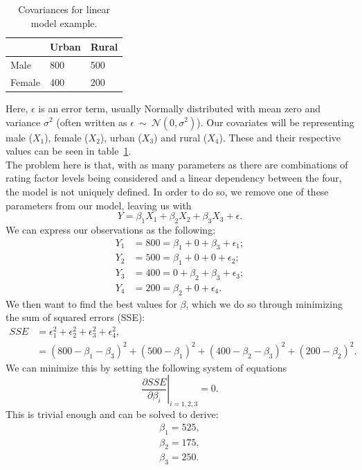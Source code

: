 \documentclass{article}
\begin{document}
\begin{table}[H]
\centering
\begin{tabular}{l|l|l|}
\cline{2-3}
                             & Urban & Rural \\ \hline
\multicolumn{1}{|l|}{Male}   & 800   & 500   \\ \hline
\multicolumn{1}{|l|}{Female} & 400   & 200   \\ \hline
\end{tabular}
    \caption{Covariances for linear model example.}
    \label{fig:covariances_example}
\end{table}

Here, $\epsilon$ is an error term, usually Normally distributed with mean zero and variance $\sigma^2$ (often written as $\epsilon~\sim~\mathcal{N}(0,\sigma^2)$). Our covariates will be representing male ($X_1$), female ($X_2$), urban ($X_3$) and rural ($X_4$). These and their respective values can be seen in table~\ref{fig:covariances_example}.\\
The problem here is that, with as many parameters as there are combinations of rating factor levels being considered and a linear dependency between the four, the model is not uniquely defined. In order to do so, we remove one of these parameters from our model, leaving us with
\begin{equation}
    Y = \beta_1X_1 + \beta_2X_2 + \beta_3X_3  + \epsilon. \label{eq:linear_model_1}
\end{equation}
We can express our observations as the following:
\begin{align}
    Y_1 &= 800 = \beta_1 + 0 + \beta_3 + \epsilon_1;\\
    Y_2 &= 500 = \beta_1 + 0 + 0 + \epsilon_2;\\
    Y_3 &= 400 = 0 + \beta_2 + \beta_3 + \epsilon_3;\\
    Y_4 &= 200 = \beta_2 + 0 + \epsilon_4.
\end{align}
We then want to find the best values for $\beta$, which we do so through minimizing the sum of squared errors (SSE):
\begin{align}
    SSE &= \epsilon_1^2 + \epsilon_2^2 + \epsilon_3^2 + \epsilon_4^2, \\
    &= (800-\beta_1-\beta_3)^2 + (500-\beta_1)^2 + (400-\beta_2 - \beta_3)^2 + (200-\beta_2)^2.
\end{align}
We can minimize this by setting the following system of equations
\begin{equation}
    \left.\frac{\partial SSE}{\partial \beta_i}\right\vert_{i=1,2,3} = 0.
\end{equation}
This is trivial enough and can be solved to derive:
\begin{align}
    \beta_1 = 525,\\ \label{eq:simp1}
    \beta_2 = 175,\\
    \beta_3 = 250.\label{eq:simp3}
\end{align}
\end{document}
